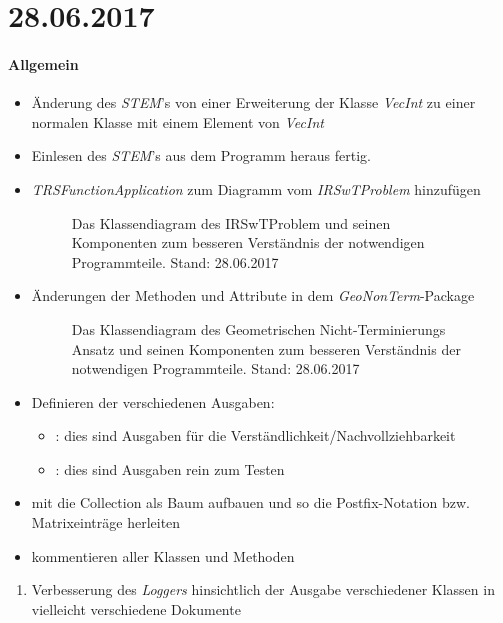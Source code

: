 \newpage
\section*{28.06.2017}

\paragraph{Allgemein}
\begin{itemize}
	\item Änderung des \emph{STEM}'s von einer Erweiterung der Klasse \emph{VecInt} zu einer normalen Klasse mit einem Element von \emph{VecInt}
	\item Einlesen des \emph{STEM}'s aus dem Programm heraus fertig.
	\item \emph{TRSFunctionApplication} zum Diagramm vom \emph{IRSwTProblem} hinzufügen
		\begin{figure}[H]
			\centering
			
			\caption{Das Klassendiagram des IRSwTProblem und seinen Komponenten zum besseren Verständnis der notwendigen Programmteile. Stand: 28.06.2017}
			\label{28.06.2017:: IRSwTPRoblem-classdiagram}
		\end{figure}
	\item Änderungen der Methoden und Attribute in dem \emph{GeoNonTerm}-Package
		\begin{figure}[H]
			\centering
			
			\caption{Das Klassendiagram des Geometrischen Nicht-Terminierungs Ansatz und seinen Komponenten zum besseren Verständnis der notwendigen Programmteile. Stand: 28.06.2017}
			\label{28.06.2017:: GeoNonTerm-classdiagram}
		\end{figure}
	\item Definieren der verschiedenen Ausgaben:
		\begin{itemize}
			\item \code{\#\#\#\#\#\#\#\#\#\#}: dies sind Ausgaben für die Verständlichkeit/Nachvollziehbarkeit
			\item \code{++++++++++}: dies sind Ausgaben rein zum Testen
		\end{itemize}
	\item mit  die Collection als Baum aufbauen und so die Postfix-Notation bzw. Matrixeinträge herleiten
	\item kommentieren aller Klassen und Methoden
\end{itemize}


\begin{enumerate}
	\item Verbesserung des \emph{Loggers} hinsichtlich der Ausgabe verschiedener Klassen in vielleicht verschiedene Dokumente
\end{enumerate}

